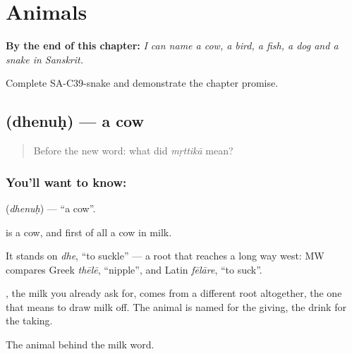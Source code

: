 
\chapter{Animals}
\label{ch:sa-animals}

\begin{chapteropening}
\textbf{By the end of this chapter:} \emph{I can name a cow, a bird, a fish, a dog and a snake in Sanskrit.}

Complete SA-C39-snake and demonstrate the chapter promise.
\end{chapteropening}

\section[\texorpdfstring{\sk{धेनुः} (dhenuḥ)}{धेनुः (dhenuḥ)}]{ (dhenuḥ) — a cow}

\label{lesson:SA-C39-cow}



\begin{quote}
Before the new word: what did \emph{mṛttikā} mean?
\end{quote}

\subsection*{You'll want to know: }
\textbf{} (\emph{dhenuḥ}) — \textquotedblleft{}a cow\textquotedblright{}.

\textbf{} is a cow, and first of all a cow in milk.

It stands on \emph{dhe}, \textquotedblleft{}to suckle\textquotedblright{} — a root that reaches a long way west: MW compares Greek \emph{thēlē}, \textquotedblleft{}nipple\textquotedblright{}, and Latin \emph{fēlāre}, \textquotedblleft{}to suck\textquotedblright{}.

, the milk you already ask for, comes from a different root altogether, the one that means to draw milk off. The animal is named for the giving, the drink for the taking.

\begin{grammarlens}[title={What you've built}]
The animal behind the milk word.
\end{grammarlens}

